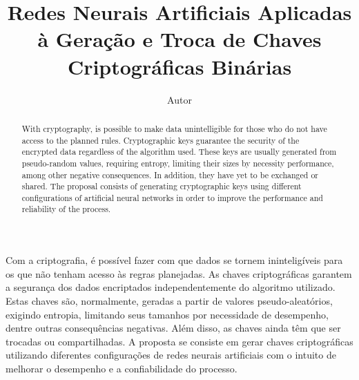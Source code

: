 \documentclass[12pt]{article}
\begin{document}

    \title{
        Redes Neurais Artificiais Aplicadas à Geração e Troca de Chaves Criptográficas Binárias
    }
    
    \author{Autor}

    
    \address{
        Instituição\\Endereço
    }
    
    \maketitle

    \begin{abstract}
        With cryptography, is possible to make data unintelligible for those who do not have access to the planned rules. Cryptographic keys guarantee the security of the encrypted data regardless of the algorithm used. These keys are usually generated from pseudo-random values, requiring entropy, limiting their sizes by necessity performance, among other negative consequences. In addition, they have yet to be exchanged or shared. The proposal consists of generating cryptographic keys using different configurations of artificial neural networks in order to improve the performance and reliability of the process.
    \end{abstract}


    \begin{resumo}
        Com a criptografia, é possível fazer com que dados se tornem ininteligíveis para os que não tenham acesso às regras planejadas. As chaves criptográficas garantem a segurança dos dados encriptados independentemente do algoritmo utilizado. Estas chaves são, normalmente, geradas a partir de valores pseudo-aleatórios, exigindo entropia, limitando seus tamanhos por necessidade de desempenho, dentre outras consequências negativas. Além disso, as chaves ainda têm que ser trocadas ou compartilhadas. A proposta se consiste em gerar chaves criptográficas utilizando diferentes configurações de redes neurais artificiais com o intuito de melhorar o desempenho e a confiabilidade do processo.
        
    \end{resumo}
  
\end{document}
